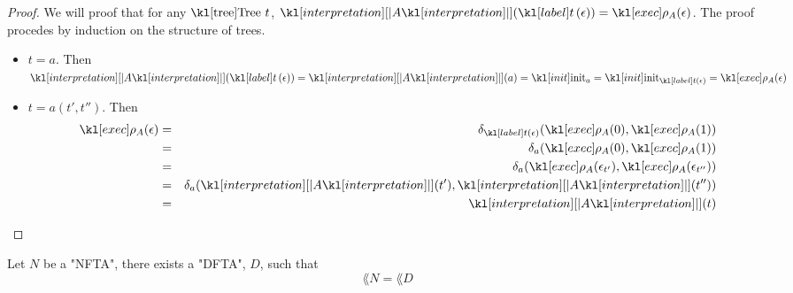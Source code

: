 \documentclass{article}
\begin{document}
\begin{proof}
	We will proof that for any $\tree \ t$, $\interpret A (\tlabel t {\epsilon}) = \exec A (\epsilon)$.
	The proof procedes by induction on the structure of trees.
	\begin{itemize}
		\item $t = a$. Then
		      $\interpret A (\tlabel t {\epsilon}) = \interpret A (a)=  \init_a = \init_{\tlabel t {\epsilon}} = \exec A (\epsilon)$
		\item $t = a(t',t'')$. Then
		      \begin{eqnarray*}
			      \exec A (\epsilon)  &=& \delta_{\tlabel t {\epsilon}}(\exec A (0), \exec A (1)) \\
			      &=& \delta_a (\exec A (0), \exec A (1)) \\
			      &=& \delta_a (\exec A (\epsilon_{t'}), \exec A (\epsilon_{t''})) \\
			      &=& \delta_a (\interpret A (t'), \interpret A (t'')) \\
			      &=& \interpret A (t)
		      \end{eqnarray*}
	\end{itemize}
\end{proof}

\begin{theorem}
	Let $N$ be a "NFTA", there exists a "DFTA", $D$, such that
	$$\lang N = \lang D$$
\end{theorem}
\end{document}
